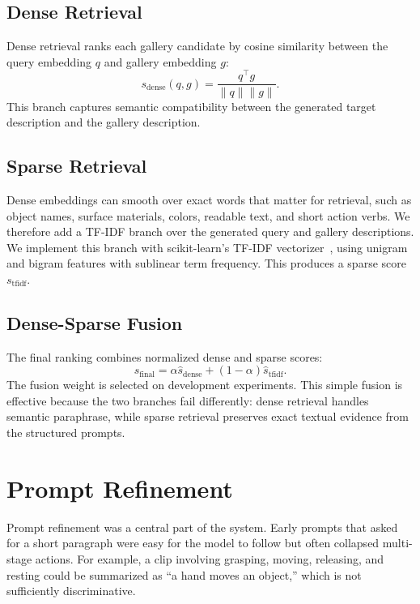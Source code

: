 \documentclass[10pt,twocolumn,letterpaper]{article}
\begin{document}
\subsection{Dense Retrieval}

Dense retrieval ranks each gallery candidate by cosine similarity between the query embedding $q$ and gallery embedding $g$:
\begin{equation}
    s_{\mathrm{dense}}(q,g) =
    \frac{q^\top g}{\|q\|\|g\|}.
\end{equation}
This branch captures semantic compatibility between the generated target description and the gallery description.

\subsection{Sparse Retrieval}

Dense embeddings can smooth over exact words that matter for retrieval, such as object names, surface materials, colors, readable text, and short action verbs.
We therefore add a TF-IDF branch over the generated query and gallery descriptions.
We implement this branch with scikit-learn's TF-IDF vectorizer~\cite{pedregosa2011scikit}, using unigram and bigram features with sublinear term frequency.
This produces a sparse score $s_{\mathrm{tfidf}}$.

\subsection{Dense-Sparse Fusion}

The final ranking combines normalized dense and sparse scores:
\begin{equation}
    s_{\mathrm{final}} =
    \alpha \hat{s}_{\mathrm{dense}} +
    (1-\alpha)\hat{s}_{\mathrm{tfidf}}.
\end{equation}
The fusion weight is selected on development experiments.
This simple fusion is effective because the two branches fail differently: dense retrieval handles semantic paraphrase, while sparse retrieval preserves exact textual evidence from the structured prompts.

\section{Prompt Refinement}

Prompt refinement was a central part of the system.
Early prompts that asked for a short paragraph were easy for the model to follow but often collapsed multi-stage actions.
For example, a clip involving grasping, moving, releasing, and resting could be summarized as ``a hand moves an object,'' which is not sufficiently discriminative.
\end{document}
